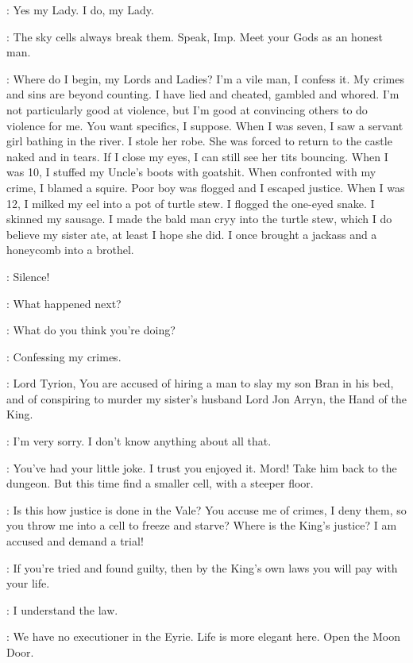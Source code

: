 \TYRION:  Yes my Lady. I do, my Lady. 

\LYSA:  The sky cells always break them.  Speak, Imp. Meet your Gods as an honest man. 

\TYRION:  Where do I begin, my Lords and Ladies? I'm a vile man, I confess it. My crimes and sins are beyond counting. I have lied and cheated, gambled and whored. I'm not particularly good at violence, but I'm good at convincing others to do violence for me.  You want specifics, I suppose. When I was seven, I saw a servant girl bathing in the river. I stole her robe. She was forced to return to the castle naked and in tears. If I close my eyes, I can still see her tits bouncing.  When I was 10, I stuffed my Uncle's boots with goatshit. When confronted with my crime, I blamed a squire. Poor boy was flogged and I escaped justice. When I was 12, I milked my eel into a pot of turtle stew.  I flogged the one-eyed snake.  I skinned my sausage. I made the bald man cryy into the turtle stew, which I do believe my sister ate, at least I hope she did. I once brought a jackass and a honeycomb into a brothel.

\LYSA:  Silence! 

\ROBYN:  What happened next? 

\LYSA:  What do you think you're doing? 

\TYRION:  Confessing my crimes. 

\CATELYN:  Lord Tyrion, You are accused of hiring a man to slay my son Bran in his bed, and of conspiring to murder my sister's husband Lord Jon Arryn, the Hand of the King. 

\TYRION:  I'm very sorry. I don't know anything about all that. 

\LYSA:  You've had your little joke. I trust you enjoyed it. Mord!  Take him back to the dungeon. But this time find a smaller cell, with a steeper floor. 

\TYRION:  Is this how justice is done in the Vale? You accuse me of crimes, I deny them, so you throw me into a cell to freeze and starve? Where is the King's justice? I am accused and demand a trial! 

\LYSA: If you're tried and found guilty, then by the King's own laws you will pay with your life. 

\TYRION:  I understand the law. 

\LYSA:  We have no executioner in the Eyrie. Life is more elegant here.  Open the Moon Door. 


